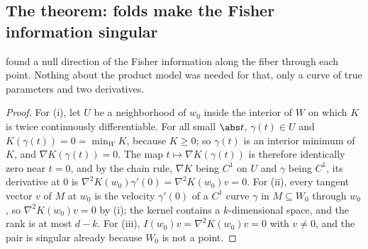 \begin{refsection}
\section{The theorem: folds make the Fisher information singular}\label{sec:singular:fisher}

 found a null direction of the Fisher information along the fiber through each point. Nothing about the product model was needed for that, only a curve of true parameters and two derivatives.


\begin{proof}
For (i), let $U$ be a neighborhood of $w_0$ inside the interior of $W$ on which $K$ is twice continuously differentiable. For all small $\abs t$, $\gamma(t)\in U$ and $K(\gamma(t))=0=\min_WK$, because $K\ge0$; so $\gamma(t)$ is an interior minimum of $K$, and $\nabla K(\gamma(t))=0$. The map $t\mapsto\nabla K(\gamma(t))$ is therefore identically zero near $t=0$, and by the chain rule, $\nabla K$ being $C^1$ on $U$ and $\gamma$ being $C^1$, its derivative at $0$ is $\nabla^2K(w_0)\gamma'(0)=\nabla^2K(w_0)v=0$. For (ii), every tangent vector $v$ of $M$ at $w_0$ is the velocity $\gamma'(0)$ of a $C^1$ curve $\gamma$ in $M\subseteq W_0$ through $w_0$, so $\nabla^2K(w_0)v=0$ by (i); the kernel contains a $k$-dimensional space, and the rank is at most $d-k$. For (iii), $I(w_0)v=\nabla^2K(w_0)v=0$ with $v\ne0$, and the pair is singular already because $W_0$ is not a point.
\end{proof}


\end{refsection}
